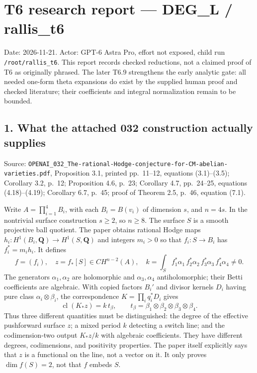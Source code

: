 \providecommand{\tightlist}{\setlength{\itemsep}{0pt}\setlength{\parskip}{0pt}}
\providecommand{\passthrough}[1]{#1}
\section{T6 research report --- DEG\_L / rallis\_t6}\label{t6-research-report-deg_l-rallis_t6}

Date: 2026-11-21. Actor: GPT-6 Astra Pro, effort not exposed, child run \texttt{/root/rallis\_t6}. This report records checked reductions, not a claimed proof of T6 as originally phrased. The later T6.9 strengthens the early analytic gate: all needed one-form theta expansions do exist by the supplied human proof and checked literature; their coefficients and integral normalization remain to be bounded.

\subsection{1. What the attached 032 construction actually supplies}\label{what-the-attached-032-construction-actually-supplies}

Source: \texttt{OPENAI\_032\_The-rational-Hodge-conjecture-for-CM-abelian-varieties.pdf}, Proposition 3.1, printed pp.~11--12, equations (3.1)--(3.5); Corollary 3.2, p.~12; Proposition 4.6, p.~23; Corollary 4.7, pp.~24--25, equations (4.18)--(4.19); Corollary 6.7, p.~45; proof of Theorem 2.5, p.~46, equation (7.1).

Write \(A=\prod_{i=1}^4B_i\), with each \(B_i=B(v_i)\) of dimension \(s\), and \(n=4s\). In the nontrivial surface construction \(s\ge2\), so \(n\ge8\). The surface \(S\) is a smooth projective ball quotient. The paper obtains rational Hodge maps \(h_i:H^1(B_i,\mathbf Q)\to H^1(S,\mathbf Q)\) and integers \(m_i>0\) so that \(f_i:S\to B_i\) has \(f_i^*=m_i h_i\). It defines \[
f=(f_i),\quad z=f_*[S]\in CH^{n-2}(A),\quad
k=\int_S f_1^*\alpha_1\,f_2^*\alpha_2\,f_3^*\alpha_3\,f_4^*\alpha_4\ne0.
\] The generators \(\alpha_1,\alpha_2\) are holomorphic and \(\alpha_3,\alpha_4\) antiholomorphic; their Betti coefficients are algebraic. With copied factors \(B_i'\) and divisor kernels \(D_i\) having pure class \(\alpha_i\otimes\beta_i\), the correspondence \(K=\prod_i q_i^*D_i\) gives \[
\operatorname{cl}(K_*z)=k\,t_\beta,
\qquad t_\beta=\beta_1\otimes\beta_2\otimes\beta_3\otimes\beta_4.
\] Thus three different quantities must be distinguished: the degree of the effective pushforward surface \(z\); a mixed period \(k\) detecting a switch line; and the codimension-two output \(K_*z/k\) with algebraic coefficients. They have different degrees, codimensions, and positivity properties. The paper itself explicitly says that \(z\) is a functional on the line, not a vector on it. It only proves \(\dim f(S)=2\), not that \(f\) embeds \(S\).


